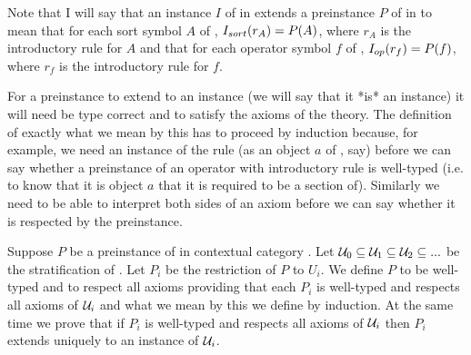 Note that I will say that an instance $I$ of \gatUw in \catcw extends a preinstance $P$ of \gatUw in \catcw to mean that for each sort symbol $A$ of \gatU,
$I_{sort}(r_A) = P(A)$, where $r_A$ is the introductory rule for $A$ and that for each operator symbol
$f$ of \gatU,   $I_{op}(r_f) = P(f)$, where $r_f$ is the introductory rule for $f$.

\note
 For a preinstance to extend to an instance (we will say that it *is* an instance) 
it will need be type correct and to satisfy the axioms of the theory. The definition of exactly what we mean by this has to proceed by induction because, for example, we need an instance of the rule
 (as an object $a$ of \catc, say) before we can say whether a preinstance of an operator with introductory rule \genericfintroductoryrule
is well-typed (i.e. to know that it is object $a$ that it is required to be a section of).
Similarly we need to be able to interpret both sides of an axiom before we can say whether it is respected
by the preinstance. 

\note Suppose $P$ be a preinstance of \gatUw in contextual category \catc.
Let $\mathcal{U}_0 \subseteq \mathcal{U}_1 \subseteq \mathcal{U}_2 \subseteq ...$ be the stratification of \gatU. 
Let $P_i$ be the restriction of $P$ to $U_i$. 
We define $P$ to be well-typed and to respect all axioms 
providing that  each  $P_i$ is well-typed and respects all axioms of $\mathcal{U}_i$ and 
what we mean by this we define by induction. 
At the same time we prove that if $P_i$ is well-typed and respects all axioms of $\mathcal{U}_i$ then $P_i$
extends uniquely to an instance of $\mathcal{U}_i$.  

